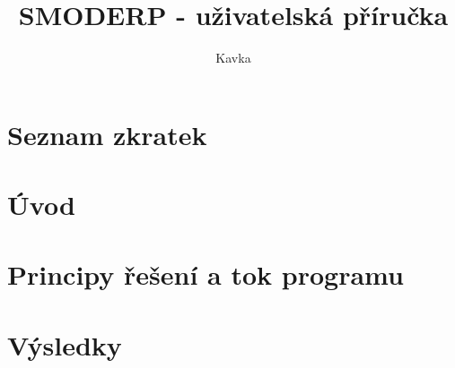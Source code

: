 \documentclass[a4paper, 11pt, twoside]{article}
\begin{document}
\title{SMODERP - uživatelská příručka}
\author{Kavka}


\clearpage\maketitle
\thispagestyle{empty}



\newpage
{}\setcounter{page}{1} %
\tableofcontents{}


\newpage
\section*{Seznam zkratek}
\begin{multicols}{2}

\end{multicols}



\newpage
{}\setcounter{page}{1}%
\section*{Úvod}



\newpage
\section{Principy řešení a tok programu}


\newpage
\section{Výsledky}


\newpage

\end{document}
